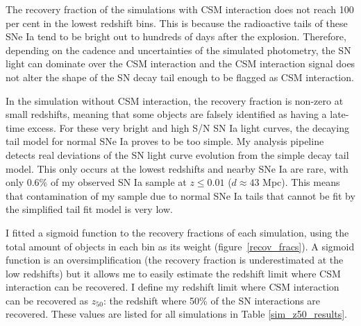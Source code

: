 \documentclass[a4paper,oneside,12pt, class=Latex/Classes/PhDthesisPSnPDF, crop=false]{standalone}
\begin{document}
The recovery fraction of the simulations with CSM interaction does not reach 100 per cent in the lowest redshift bins. This is because the radioactive tails of these SNe Ia tend to be bright out to hundreds of days after the explosion. Therefore, depending on the cadence and uncertainties of the simulated photometry, the SN light can dominate over the CSM interaction and the CSM interaction signal does not alter the shape of the SN decay tail enough to be flagged as CSM interaction.

In the simulation without CSM interaction, the recovery fraction is non-zero at small redshifts, meaning that some objects are falsely identified as having a late-time excess. For these very bright and high S/N SN Ia light curves, the decaying tail model for normal SNe Ia proves to be too simple. My analysis pipeline detects real deviations of the SN light curve evolution from the simple decay tail model. This only occurs at the lowest redshifts and nearby SNe Ia are rare, with only 0.6\% of my observed SN Ia sample at $z\leq0.01$ ($d\approx43$ Mpc). This means that contamination of my sample due to normal SNe Ia tails that cannot be fit by the simplified tail fit model is very low.

I fitted a sigmoid function to the recovery fractions of each simulation, using the total amount of objects in each bin as its weight (figure~\ref{recov_fracs}). A sigmoid function is an oversimplification (the recovery fraction is underestimated at the low redshifts) but it allows me to easily estimate the redshift limit where CSM interaction can be recovered. I define my redshift limit where CSM interaction can be recovered as $z_{50}$: the redshift where 50\% of the SN interactions are recovered. These values are listed for all simulations in Table \ref{sim_z50_results}.
\end{document}
